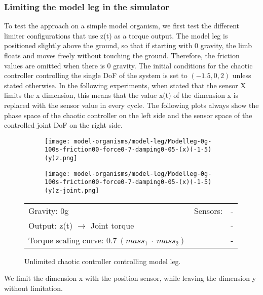 \documentclass[main]{subfiles}
\begin{document}
\subsubsection{Limiting the model leg in the simulator}

To test the approach on a simple model organism, we first test the different limiter configurations that use z(t) as a torque output. The model leg is positioned slightly above the ground, so that if starting with 0 gravity, the limb floats and moves freely without touching the ground. Therefore, the friction values are omitted when there is 0 gravity. The initial conditions for the chaotic controller controlling the single DoF of the system is set to \((-1.5,0,2)\) unless stated otherwise. In the following experiments, when stated that the sensor X limits the x dimension, this means that the value x(t) of the dimension x is replaced with the sensor value in every cycle. The following plots always show the phase space of the chaotic controller on the left side and the sensor space of the controlled joint DoF on the right side.


\begin{figure}[H]
	\centering
	\begin{subfigure}[c]{0.45\textwidth}
	\texttt{[image: model-organisms/model-leg/Modelleg-0g-100s-friction00-force0-7-damping0-05-(x)(-1-5)(y)z.png]}
	\end{subfigure}
	\begin{subfigure}[c]{0.45\textwidth}
	\texttt{[image: model-organisms/model-leg/Modelleg-0g-100s-friction00-force0-7-damping0-05-(x)(-1-5)(y)z-joint.png]}
	\end{subfigure}
	\caption[Unlimited chaotic controller controlling model leg]{Unlimited chaotic controller controlling model leg.}
	\begin{tabular}{l|ll}
	\hline 
	Gravity: 0g  & Sensors: & - \\
	 Output: z(t) \(\rightarrow\) Joint torque & & - \\
	  Torque scaling curve: \(0.7~(mass_1~\cdot~mass_2)\) & & - \\
	  \hline
	\end{tabular}

	\label{figure:unlimited-model-leg}
\end{figure}

We limit the dimension x with the position sensor, while leaving the dimension y without limitation.
\end{document}
